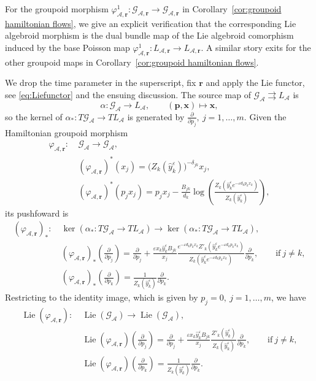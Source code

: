 \documentclass{amsart}
\numberwithin{equation}{section}
\newcommand{\bfp}{{\boldsymbol{p}}}
\newcommand{\bfr}{{\boldsymbol{r}}}
\newcommand{\bfx}{{\boldsymbol{x}}}
\newcommand{\cA}{\mathcal{A}}
\newcommand{\cG}{\mathcal{G}}
\newcommand{\Lie}{\operatorname{Lie}}
\newcommand{\rra}{\rightrightarrows}
\begin{document}
For the groupoid morphism $\varphi_{\cA,\bfr}^1: \cG_{\cA,\bfr} \to \cG_{\cA,\bfr}$ in Corollary~\ref{cor:groupoid hamiltonian flows}, we give an explicit verification that the corresponding Lie algebroid morphism is the dual bundle map of the Lie algebroid comorphism induced by the base Poisson map $\varphi_{\cA,\bfr}^1:L_{\cA,\bfr}\to L_{\cA,\bfr}$. A similar story exits for the other groupoid maps in Corollary~\ref{cor:groupoid hamiltonian flows}.

We drop the time parameter in the superscript, fix $\bfr$ and apply the Lie functor, see \eqref{eq:Liefunctor} and the ensuing discussion. The source map of $\cG_\cA \rra L_\cA$ is 
\[
	\alpha: \cG_\cA \to L_\cA, \qquad (\bfp, \bfx) \mapsto \bfx,
\]
so the kernel of $\alpha_*: T\cG_\cA \to TL_\cA$ is generated by $\frac{\partial}{\partial p_j}, \> j = 1, \ldots, m$.
Given the Hamiltonian groupoid morphism
\begin{align*}
	\varphi_{\cA,\bfr}: ~& \cG_\cA \to \cG_\cA, \\
	& (\varphi_{\cA,\bfr})^*(x_j) = \big(Z_k(\hat y_k^\varepsilon)\big)^{-\delta_{jk}}x_j, \\
	& (\varphi_{\cA,\bfr})^*(p_jx_j) = p_jx_j-\frac{B_{jk}}{d_k}\log\left(\frac{Z_k\left(\hat y_k^\varepsilon e^{-\varepsilon d_kp_kx_k}\right)}{Z_k(\hat y_k^\varepsilon)}\right),
\end{align*}
its pushfoward is
\begin{align*}
	\left(\varphi_{\cA,\bfr}\right)_*: ~& \ker(\alpha_*: T\cG_\cA \to TL_\cA) \to \ker(\alpha_*: T\cG_\cA \to TL_\cA),  \\
	& \left(\varphi_{\cA,\bfr}\right)_* \left(\frac{\partial}{\partial p_j} \right)
	= \frac{\partial}{\partial p_j} + \frac{\varepsilon x_k \hat{y}_k^\varepsilon B_{jk}}{x_j} \frac{ e^{-\varepsilon d_kp_kx_k} Z'_k\left(\hat y_k^\varepsilon e^{-\varepsilon d_kp_kx_k}\right)}{Z_k\left(\hat y_k^\varepsilon e^{-\varepsilon d_kp_kx_k}\right)} \frac{\partial}{\partial p_k}, \qquad \text{if}~ j \ne k, \\
	& \left(\varphi_{\cA,\bfr}\right)_* \left(\frac{\partial}{\partial p_k} \right)
	= \frac{1}{Z_k(\hat y_k^\varepsilon)}\frac{\partial}{\partial p_k}.
\end{align*}
Restricting to the identity image, which is given by $p_j = 0, \> j = 1, \ldots, m$, we have
\begin{align*}
	\Lie \left(\varphi_{\cA,\bfr} \right): ~& \Lie \left(\cG_\cA \right) \to \Lie \left( \cG_\cA \right),  \\
	& \Lie \left(\varphi_{\cA,\bfr} \right) \left(\frac{\partial}{\partial p_j} \right)
	= \frac{\partial}{\partial p_j} + \frac{\varepsilon x_k \hat{y}_k^\varepsilon B_{jk}}{x_j} \frac{Z'_k\left(\hat y_k^\varepsilon \right)}{Z_k\left(\hat y_k^\varepsilon \right)} \frac{\partial}{\partial p_k}, \qquad \text{if}~ j \ne k, \\
	& \Lie \left(\varphi_{\cA,\bfr} \right) \left(\frac{\partial}{\partial p_k} \right)
	= \frac{1}{Z_k(\hat{y}_k^\varepsilon)}\frac{\partial}{\partial p_k}.
\end{align*}
\end{document}

